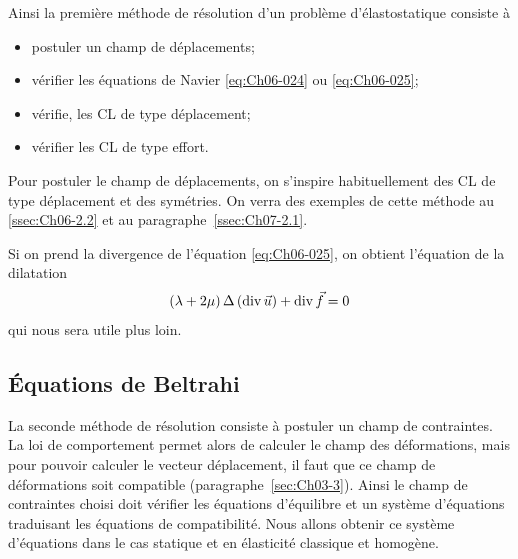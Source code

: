 Ainsi la première méthode de résolution d'un problème d'élastostatique consiste à 
\begin{itemize}
    \item postuler un champ de déplacements;
    \item vérifier les équations de Navier \eqref{eq:Ch06-024} ou \eqref{eq:Ch06-025};
    \item vérifie, les CL de type déplacement;
    \item vérifier les CL de type effort.
\end{itemize}
Pour postuler le champ de déplacements, on s'inspire habituellement des CL de type déplacement et des symétries.
On verra des exemples de cette méthode au \ref{ssec:Ch06-2.2} et au paragraphe~\ref{ssec:Ch07-2.1}. 

Si on prend la divergence de l'équation \eqref{eq:Ch06-025}, on obtient l'équation de la dilatation
\begin{equation}
    \left( \lambda + 2 \mu \right) \Delta \left( \operatorname*{\mathrm{div}} \vec{u} \right) + \operatorname*{\mathrm{div}} \vec{f} = 0
    \label{eq:Ch06-026}
\end{equation}
qui nous sera utile plus loin.

\subsection{Équations de Beltrahi}
La seconde méthode de résolution consiste à postuler un champ de contraintes.
La loi de comportement permet alors de calculer le champ des déformations, mais pour pouvoir calculer le vecteur déplacement, il faut que ce champ de déformations soit compatible (paragraphe~\ref{sec:Ch03-3}).
Ainsi le champ de contraintes choisi doit vérifier les équations d'équilibre et un système d'équations traduisant les équations de compatibilité.
Nous allons obtenir ce système d'équations dans le cas statique et en élasticité classique et homogène.

